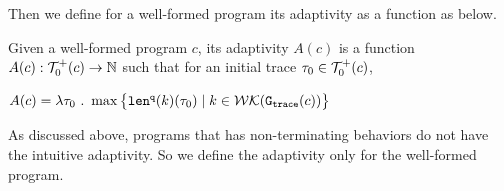 Then we define for a well-formed program its adaptivity as a function as below.
\begin{defn}
    \label{def:trace_adapt}
    Given a well-formed program ${c}$, 
    its adaptivity $A(c)$ is a function 
    $A(c) : \mathcal{T}^{+}_0(c)\to \mathbb{N}$ such that for an
    initial trace $\mathtt{\tau}_0 \in \mathcal{T}^{+}_0(c)$, 
\begin{center}
$
    A(c) = \lambda \mathtt{\tau}_0 ~.~ \max \big 
    \{ \mathtt{len}^{\tt q}(k)(\mathtt{\tau}_0) \mid k \in \mathcal{WK}(\mathtt{{G_{trace}}}(c)) \big \} 
$
\end{center}
\end{defn}
As discussed above, programs that has non-terminating behaviors do not have the intuitive adaptivity. So we define the adaptivity only for the well-formed program.
